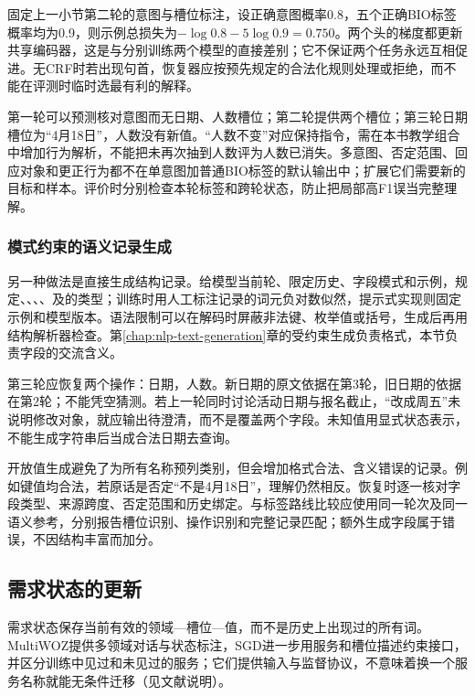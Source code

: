 固定上一小节第二轮的意图与槽位标注，设正确意图概率0.8，五个正确BIO标签概率均为0.9，则示例总损失为$-\log0.8-5\log0.9=0.750$。两个头的梯度都更新共享编码器，这是与分别训练两个模型的直接差别；它不保证两个任务永远互相促进。无CRF时若出现句首，恢复器应按预先规定的合法化规则处理或拒绝，而不能在评测时临时选最有利的解释。

第一轮可以预测核对意图而无日期、人数槽位；第二轮提供两个槽位；第三轮日期槽位为“4月18日”，人数没有新值。“人数不变”对应保持指令，需在本书教学组合中增加行为解析，不能把未再次抽到人数评为人数已消失。多意图、否定范围、回应对象和更正行为都不在单意图加普通BIO标签的默认输出中；扩展它们需要新的目标和样本。评价时分别检查本轮标签和跨轮状态，防止把局部高F1误当完整理解。

\subsubsection{模式约束的语义记录生成}
\label{sec:nlp-dialogue-semantic-record}

另一种做法是直接生成结构记录。给模型当前轮、限定历史、字段模式和示例，规定、、、、及的类型；训练时用人工标注记录的词元负对数似然，提示式实现则固定示例和模型版本。语法限制可以在解码时屏蔽非法键、枚举值或括号，生成后再用结构解析器检查。第\ref{chap:nlp-text-generation}章的受约束生成负责格式，本节负责字段的交流含义。

第三轮应恢复两个操作：日期，人数。新日期的原文依据在第3轮，旧日期的依据在第2轮；不能凭空猜测。若上一轮同时讨论活动日期与报名截止，“改成周五”未说明修改对象，就应输出待澄清，而不是覆盖两个字段。未知值用显式状态表示，不能生成字符串后当成合法日期去查询。

开放值生成避免了为所有名称预列类别，但会增加格式合法、含义错误的记录。例如键值均合法，若原话是否定“不是4月18日”，理解仍然相反。恢复时逐一核对字段类型、来源跨度、否定范围和历史绑定。与标签路线比较应使用同一轮次及同一语义参考，分别报告槽位识别、操作识别和完整记录匹配；额外生成字段属于错误，不因结构丰富而加分。

\subsection{需求状态的更新}
\label{sec:nlp-dialogue-state}

需求状态保存当前有效的领域—槽位—值，而不是历史上出现过的所有词。MultiWOZ提供多领域对话与状态标注，SGD进一步用服务和槽位描述约束接口，并区分训练中见过和未见过的服务；它们提供输入与监督协议，不意味着换一个服务名称就能无条件迁移（见文献说明）。

